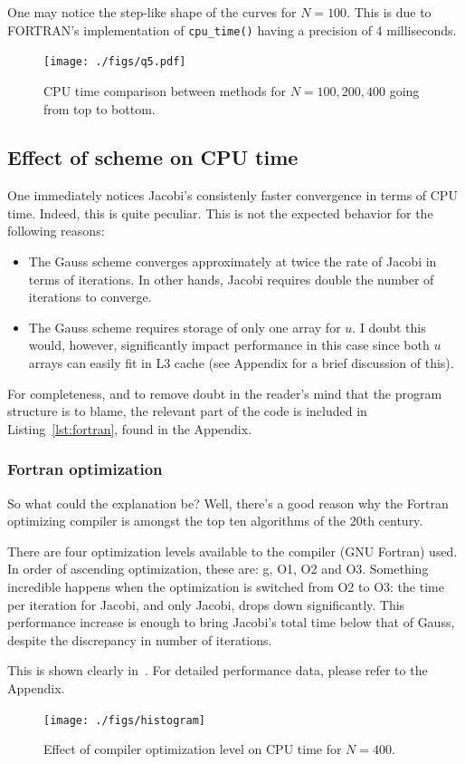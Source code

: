 \documentclass{SelimArticle}
\begin{document}
One may notice the step-like shape of the curves for $N=100$. This is due to FORTRAN's implementation
of \texttt{cpu\_time()} having a precision of 4 milliseconds.
\begin{figure}
    \centering
    \texttt{[image: ./figs/q5.pdf]}
    \caption{CPU time comparison between methods for $N = 100, 200, 400$ going from top to bottom.}\label{fig:resvscpu}
\end{figure}
\subsection{Effect of scheme on CPU time}
One immediately notices Jacobi's consistenly faster convergence in terms of CPU time. Indeed, this is
quite peculiar. This is not the expected behavior for the following reasons:
\begin{itemize}[noitemsep]
    \item The Gauss scheme converges approximately at twice the rate of Jacobi in terms of iterations. In other hands,
        Jacobi requires double the number of iterations to converge.
    \item The Gauss scheme requires storage of only one array for $u$. I doubt this would, however, significantly
        impact performance in this case since both $u$ arrays can easily fit in L3 cache
        (see Appendix for a brief discussion of this).
\end{itemize}
For completeness, and to remove doubt in the reader's mind that the program structure
is to blame, the relevant part of the code is included in Listing~\ref{lst:fortran}, found in the Appendix.

\subsubsection{Fortran optimization}
So what could the explanation be? Well, there's a good reason why the Fortran optimizing compiler
is amongst the top ten algorithms of the 20th century.

There are four optimization levels available to the compiler (GNU Fortran) used.
In order of ascending optimization, these are: g, O1, O2 and O3.
Something incredible happens when the optimization is switched from O2 to O3: the time
per iteration for Jacobi, and only Jacobi, drops down significantly. This performance increase is
enough to bring Jacobi's total time below that of Gauss, despite the discrepancy in number of
iterations.

This is shown clearly in~. For detailed performance data, please refer to the
Appendix.
\begin{figure}
    \centering
    \texttt{[image: ./figs/histogram]}
    \caption{Effect of compiler optimization level on CPU time for $N=400$.}\label{fig:histogram}
\end{figure}
\end{document}

